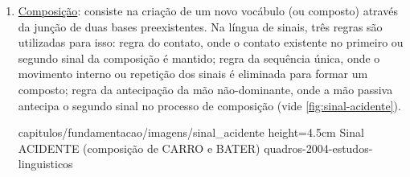 \begin{enumerate}
\begin{enumerate}
        \item \underline{Composição}: consiste na criação de um novo vocábulo (ou composto) através da junção de duas bases preexistentes. Na língua de sinais, três regras são utilizadas para isso: regra do contato, onde o contato existente no primeiro ou segundo sinal da composição é mantido; regra da sequência única, onde o movimento interno ou repetição dos sinais é eliminada para formar um composto; regra da antecipação da mão não-dominante, onde a mão passiva antecipa o segundo sinal no processo de composição (vide \autoref{fig:sinal-acidente}).
        
        

            {capitulos/fundamentacao/imagens/sinal_acidente} %
            {height=4.5cm} %
            {Sinal ACIDENTE (composição de CARRO e BATER)} %
            {quadros-2004-estudos-linguisticos} %





\end{enumerate}
\end{enumerate}

